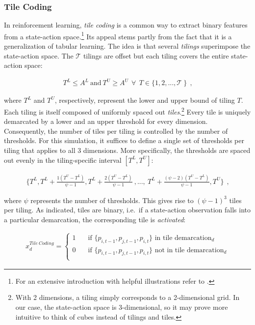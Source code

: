 \subsubsection{Tile Coding}\label{tile_coding}
In reinforcement learning, \emph{tile coding} is a common way to extract binary features from a state-action space.\footnote{For an extensive introduction with helpful illustrations refer to \textcite[pp.217-221]{sutton_reinforcement_2018}.} Its appeal stems partly from the fact that it is a generalization of tabular learning. The idea is that several \emph{tilings} superimpose the state-action space. The $\mathcal{T}$ tilings are offset but each tiling covers the entire state-action space:

\begin{gather}
	 T^L \leq A^L  ~ \text{and} ~ T^U \geq A^U ~~ \forall  ~~ T \in \{1, 2, ..., \mathcal{T} ~ \} ~~ \text{,}
\end{gather}

where $T^L$ and $T^U$, respectively, represent the lower and upper bound of tiling $T$. Each tiling is itself composed of uniformly spaced out \emph{tiles}.\footnote{With 2 dimensions, a tiling simply corresponds to a 2-dimensional grid. In our case, the state-action space is 3-dimensional, so it may prove more intuitive to think of cubes instead of tilings and tiles.} Every tile is uniquely demarcated by a lower and an upper threshold for every dimension. Consequently, the number of tiles per tiling is controlled by the number of thresholds. For this simulation, it suffices to define a single set of thresholds per tiling that applies to all 3 dimensions. More specifically, the thresholds are spaced out evenly in the tiling-specific interval $[T^L, T^U]$:

\begin{gather}
\{
T^L,
T^L + \frac{1(T^U - T^L)}{\psi - 1},
T^L + \frac{2(T^U - T^L)}{\psi - 1}~ , ... , ~
T^L + \frac{(\psi-2)(T^U - T^L)}{\psi - 1},
T^U\} ~~ \text{,}
\end{gather}

where $\psi$ represents the number of thresholds. This gives rise to $(\psi-1)^3$ tiles per tiling. As indicated, tiles are binary, i.e.\ if a state-action observation falls into a particular demarcation, the corresponding tile is \emph{activated}:

\begin{gather}\label{tile_activation}
x_d^{Tile ~ Coding} = \begin{cases}
1 & \quad \text{if } \{p_{i, t-1}, p_{j, t-1}, p_{i, t}\} \text{~in tile demarcation}_d  \\
0 & \quad \text{if } \{p_{i, t-1}, p_{j, t-1}, p_{i, t}\} \text{~not in tile demarcation}_d \\ \end{cases} 
\end{gather}

